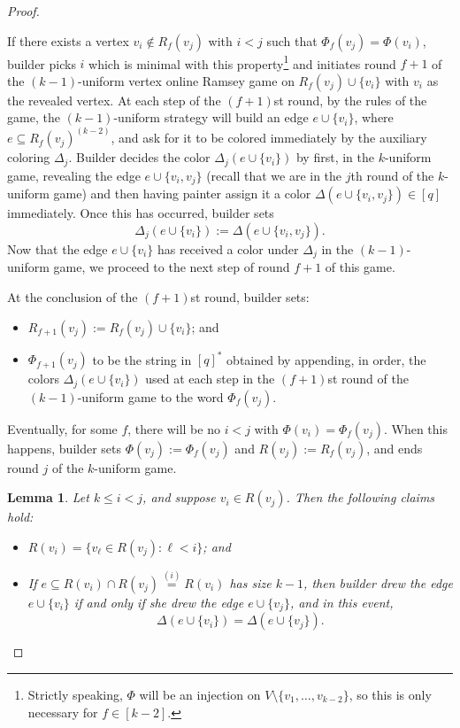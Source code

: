 \documentclass[A4paper,reqno,oneside,12pt]{amsart}
\theoremstyle{plain}
\newtheorem{lemma}[theorem]{Lemma}
\theoremstyle{definition}
\def\l{\ell}
\begin{document}
\begin{proof}
\begin{itemize}
    If there exists a vertex $v_i \notin R_f(v_j)$ with $i < j$ such that $\Phi_f(v_j) = \Phi(v_i)$,
    builder picks $i$ which is minimal with this property\footnote{Strictly speaking, $\Phi$ will be an injection on $V \setminus \{v_1, \dots, v_{k-2}\}$, so this is only necessary for $f \in [k-2]$.}
    and initiates round $f+1$ of the $(k-1)$-uniform vertex online Ramsey game on $R_f(v_j) \cup \{v_i\}$ with $v_i$ as the revealed vertex.
    At each step of the $(f+1)$st round, by the rules of the game, the $(k-1)$-uniform strategy will build an edge $e \cup \{v_i\}$, where $e \subseteq R_f(v_j)^{(k-2)}$, and ask for it to be colored immediately by the auxiliary coloring $\Delta_j$.
    Builder decides the color $\Delta_j(e \cup \{v_i\})$ by first, in the $k$-uniform game, revealing the edge $e \cup \{v_i, v_j\}$ (recall that we are in the $j$th round of the $k$-uniform game) and then having painter assign it a color $\Delta(e \cup \{v_i,v_j\}) \in [q]$ immediately.
    Once this has occurred, builder sets
    \begin{equation*}
        \Delta_j(e \cup \{v_i\}) := \Delta(e \cup \{v_i, v_j\}).
    \end{equation*}
    Now that the edge $e \cup \{v_i\}$ has received a color under $\Delta_j$ in the $(k-1)$-uniform game, we proceed to the next step of round $f+1$ of this game.

    At the conclusion of the $(f+1)$st round, builder sets:
    \begin{itemize}
        \item $R_{f+1}(v_j) := R_f(v_j) \cup \{v_i\}$; and
        \item $\Phi_{f+1}(v_j)$ to be the string in $[q]^*$ obtained by appending, in order, the colors $\Delta_j(e \cup \{v_i\})$ used at each step in the $(f+1)$st round of the $(k-1)$-uniform game to the word $\Phi_f(v_j)$.
    \end{itemize}

    Eventually, for some $f$, there will be no $i < j$ with $\Phi(v_i) = \Phi_f(v_j)$.
    When this happens, builder sets $\Phi(v_j) := \Phi_f(v_j)$ and $R(v_j) := R_f(v_j)$, and ends round $j$ of the $k$-uniform game.
\end{itemize}

\begin{lemma}
\label{lem: main}
    Let $k \leq i < j$, and suppose $v_i \in R(v_j)$.
    Then the following claims hold:
    \begin{itemize}
        \item[(i)] $R(v_i) = \{v_\l \in R(v_j): \l < i\}$; and
        \item[(ii)] If $e \subseteq R(v_i) \cap R(v_j) \overset{(i)}{=} R(v_i)$ has size $k-1$, then builder drew the edge $e \cup \{v_i\}$ if and only if she drew the edge $e \cup \{v_j\}$, and in this event,
        \begin{equation*}
            \Delta(e \cup \{v_i\}) = \Delta(e \cup \{v_j\}). 
        \end{equation*}
    \end{itemize}
\end{lemma}


\end{proof}
\end{document}
